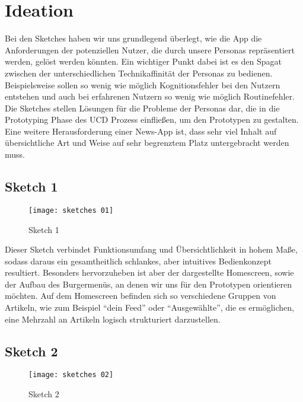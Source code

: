 
\section{Ideation}

Bei den Sketches haben wir uns grundlegend überlegt, wie die App die Anforderungen der potenziellen Nutzer, die durch unsere Personas repräsentiert werden, gelöst werden könnten. Ein wichtiger Punkt dabei ist es den Spagat zwischen der unterschiedlichen Technikaffinität der Personas zu bedienen. Beispielsweise sollen so wenig wie möglich Kognitionsfehler bei den Nutzern entstehen und auch bei erfahrenen Nutzern so wenig wie möglich Routinefehler. Die Sketches stellen Lösungen für die Probleme der Personas dar, die in die Prototyping Phase des UCD Prozess einfließen, um den Prototypen zu gestalten. Eine weitere Herausforderung einer News-App ist, dass sehr viel Inhalt auf übersichtliche Art und Weise auf sehr begrenztem Platz untergebracht werden muss.

\subsection{Sketch 1}

\begin{figure}[h]
  \centering
  \texttt{[image: sketches 01]}
  \caption{Sketch 1}
  \label{fig:sketch-01}
\end{figure}

Dieser Sketch verbindet Funktionsumfang und Übersichtlichkeit in hohem Maße, sodass daraus ein gesamtheitlich schlankes, aber intuitives Bedienkonzept resultiert. Besonders hervorzuheben ist aber der dargestellte Homescreen, sowie der Aufbau des Burgermenüs, an denen wir uns für den Prototypen orientieren möchten. Auf dem Homescreen befinden sich so verschiedene Gruppen von Artikeln, wie zum Beispiel \enquote{dein Feed} oder \enquote{Ausgewählte}, die es ermöglichen, eine Mehrzahl an Artikeln logisch strukturiert darzustellen.

\subsection{Sketch 2}

\begin{figure}[h]
  \centering
  \texttt{[image: sketches 02]}
  \caption{Sketch 2}
  \label{fig:sketch-02}
\end{figure}

